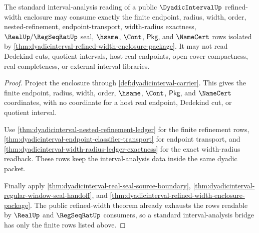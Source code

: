 \begin{theorem}
\label{thm:dyadicinterval-standard-interval-bridge-boundary}
The standard interval-analysis reading of a public $\DyadicIntervalUp$
refined-width enclosure may consume exactly the finite endpoint, radius, width,
order, nested-refinement, endpoint-transport, width-radius exactness,
$\RealUp/\RegSeqRatUp$ seal, $\hsame$, $\Cont$, $\mathsf{Pkg}$, and
$\NameCert$ rows isolated by
\autoref{thm:dyadicinterval-refined-width-enclosure-package}. It may not read
Dedekind cuts, quotient intervals, host real endpoints, open-cover compactness,
real completeness, or external interval libraries.
\end{theorem}
\begin{proof}
Project the enclosure through \autoref{def:dyadicinterval-carrier}. This gives
the finite endpoint, radius, width, order, $\hsame$, $\Cont$, $\mathsf{Pkg}$,
and $\NameCert$ coordinates, with no coordinate for a host real endpoint,
Dedekind cut, or quotient interval.

Use \autoref{thm:dyadicinterval-nested-refinement-ledger} for the finite
refinement rows, \autoref{thm:dyadicinterval-endpoint-classifier-transport}
for endpoint transport, and
\autoref{thm:dyadicinterval-width-radius-ledger-exactness} for the exact
width-radius readback. These rows keep the interval-analysis data inside the
same dyadic packet.

Finally apply \autoref{thm:dyadicinterval-real-seal-source-boundary},
\autoref{thm:dyadicinterval-regular-window-seal-handoff}, and
\autoref{thm:dyadicinterval-refined-width-enclosure-package}. The public
refined-width theorem already exhausts the rows readable by $\RealUp$ and
$\RegSeqRatUp$ consumers, so a standard interval-analysis bridge has only the
finite rows listed above.
\end{proof}


